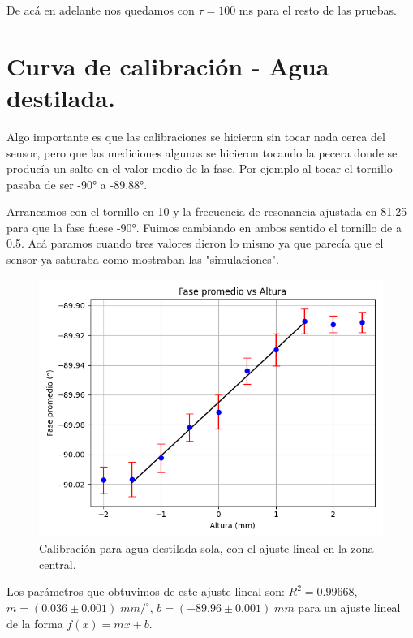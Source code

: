 De acá en adelante nos quedamos con $\tau = 100$ ms para el resto de las pruebas. 

\section{Curva de calibración - Agua destilada.}
Algo importante es que las calibraciones se hicieron sin tocar nada cerca del sensor, pero que las mediciones algunas se hicieron tocando la pecera donde se producía un salto en el valor medio de la fase. Por ejemplo al tocar el tornillo pasaba de ser -90° a -89.88°. 
 
Arrancamos con el tornillo en 10 y la frecuencia de resonancia ajustada en 81.25 para que la fase fuese -90°. Fuimos cambiando en ambos sentido el tornillo de a 0.5. Acá paramos cuando tres valores dieron lo mismo ya que parecía que el sensor ya saturaba como mostraban las "simulaciones". 

\begin{figure}[th!]
	\centering
	\includegraphics[width=0.87\linewidth]{Figures/19_05_2025/Calibraci+on_agua_sola}
	\caption{Calibración para agua destilada sola, con el ajuste lineal en la zona central.}
	\label{fig:calibracionaguasola}
\end{figure}

Los parámetros que obtuvimos de este ajuste lineal son: $R^2=0.99668$,	$m = (0.036 \pm 0.001)\; mm/ ^\circ$,	$b = (-89.96 \pm 0.001)\; mm$ para un ajuste lineal de la forma $f(x)=mx+b$. %

